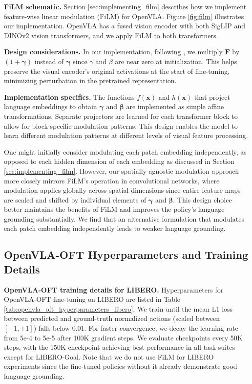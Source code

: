 \documentclass[conference]{IEEEtran}
\begin{document}
\textbf{FiLM schematic.} Section \ref{sec:implementing_film} describes how we implement feature-wise linear modulation (FiLM) \citep{perez2018film} for OpenVLA. Figure \ref{fig:film} illustrates our implementation. OpenVLA has a fused vision encoder with both SigLIP \citep{zhai2023sigmoid} and DINOv2 \citep{oquab2023dinov2} vision transformers, and we apply FiLM to both transformers.

\textbf{Design considerations.} In our implementation, following \citet{perez2018film}, we multiply $\mathbf{F}$ by $(1+\mathbf{\gamma})$ instead of $\mathbf{\gamma}$ since $\gamma$ and $\beta$ are near zero at initialization. This helps preserve the visual encoder's original activations at the start of fine-tuning, minimizing perturbation in the pretrained representation.

\textbf{Implementation specifics.} The functions $f(\mathbf{x})$ and $h(\mathbf{x})$ that project language embeddings to obtain $\mathbf{\gamma}$ and $\mathbf{\beta}$ are implemented as simple affine transformations. Separate projectors are learned for each transformer block to allow for block-specific modulation patterns. This design enables the model to learn different modulation patterns at different levels of visual feature processing.

One might initially consider modulating each patch embedding independently, as opposed to each hidden dimension of each embedding as discussed in Section \ref{sec:implementing_film}. However, our spatially-agnostic modulation approach more closely mirrors FiLM's operation in convolutional networks, where modulation applies globally across spatial dimensions since entire feature maps are scaled and shifted by individual elements of $\mathbf{\gamma}$ and $\mathbf{\beta}$. This design choice better maintains the benefits of FiLM and improves the policy's language grounding substantially. We find that an alternative formulation that modulates each patch embedding independently leads to weaker language grounding.


\subsection{OpenVLA-OFT Hyperparameters and Training Details}
\label{app:openvla_oft_training_details}

\textbf{OpenVLA-OFT training details for LIBERO.} Hyperparameters for OpenVLA-OFT fine-tuning on LIBERO are listed in Table \ref{tab:openvla_oft_hyperparameters_libero}. We train until the mean L1 loss between predicted and ground-truth normalized actions (scaled between $[-1,+1]$) falls below 0.01. For faster convergence, we decay the learning rate from 5e-4 to 5e-5 after 100K gradient steps. We evaluate checkpoints every 50K steps, with the 150K checkpoint achieving best performance in all task suites except for LIBERO-Goal. Note that we do not use FiLM for LIBERO experiments since the fine-tuned policies without it already demonstrate good language grounding.
\end{document}
